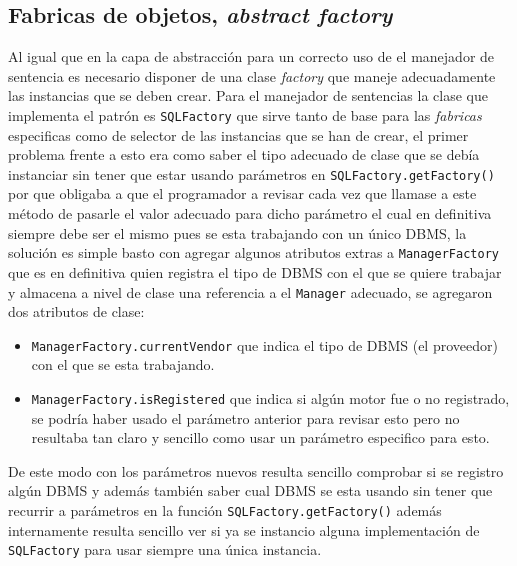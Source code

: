 \subsection{Fabricas de objetos, \textit{abstract factory}}
%
Al igual que en la capa de abstracción para un correcto uso de el manejador de sentencia es necesario disponer de una clase \textit{factory} que maneje adecuadamente las instancias que se deben crear. Para el manejador de sentencias la clase que implementa el patrón es \verb=SQLFactory= que sirve tanto de base para las \textit{fabricas} especificas como de selector de las instancias que se han de crear, el primer problema frente a esto era como saber el tipo adecuado de clase que se debía instanciar sin tener que estar usando parámetros en \verb=SQLFactory.getFactory()= por que obligaba a que el programador a revisar cada vez que llamase a este método de pasarle el valor adecuado para dicho parámetro el cual en definitiva siempre debe ser el mismo pues se esta trabajando con un único DBMS, la solución es simple basto con agregar algunos atributos extras a \verb=ManagerFactory= que es en definitiva quien registra el tipo de DBMS con el que se quiere trabajar y almacena a nivel de clase una referencia a el \verb=Manager= adecuado, se agregaron dos atributos de clase:
\begin{itemize}
\item \verb=ManagerFactory.currentVendor= que indica el tipo de DBMS (el proveedor) con el que se esta trabajando.
\item \verb=ManagerFactory.isRegistered= que indica si algún motor fue o no registrado, se podría haber usado el parámetro anterior para revisar esto pero no resultaba tan claro y sencillo como usar un parámetro especifico para esto.
\end{itemize}
De este modo con los parámetros nuevos resulta sencillo comprobar si se registro algún DBMS y además también saber cual DBMS se esta usando sin tener que recurrir a parámetros en la función  \verb=SQLFactory.getFactory()= además internamente resulta sencillo ver si ya se instancio alguna implementación de \verb=SQLFactory= para usar siempre una única instancia.

